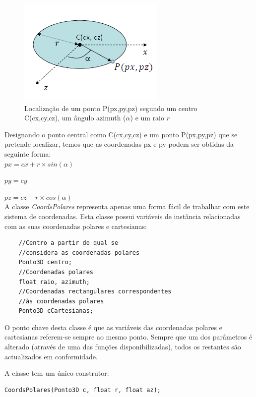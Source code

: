 \begin{figure}[<+htpb+>]
	\centering
	\includegraphics[scale=1.0]{imagens/p1_polarCoords.png}
	\caption{Localização de um ponto P(px,py,pz) segundo um centro C(cx,cy,cz), um ângulo azimuth ($\alpha$) e um raio $r$}
	\label{p1:fig:p1_polarCoords}
\end{figure}

Designando o ponto central como C(cx,cy,cz) e um ponto P(px,py,pz) que se pretende localizar, temos que as coordenadas px e py podem ser obtidas da seguinte forma:\\

	$px = cx + r \times sin(\alpha)$
	
	$py = cy$
	
	$pz = cz + r \times cos(\alpha)$\\

A classe \textit{CoordsPolares} representa apenas uma forma fácil de trabalhar com este sistema de coordenadas. Esta classe possui variáveis de instância relacionadas com as suas coordenadas polares e cartesianas:

\begin{Verbatim}
	//Centro a partir do qual se 
	//considera as coordenadas polares
	Ponto3D centro;
	//Coordenadas polares
	float raio, azimuth;
	//Coordenadas rectangulares correspondentes 
	//às coordenadas polares
	Ponto3D cCartesianas;
\end{Verbatim}

O ponto chave desta classe é que as variáveis das coordenadas polares e cartesianas referem-se sempre ao mesmo ponto. Sempre que um dos parâmetros é alterado (através de uma das funções disponibilizadas), todos os restantes são actualizados em conformidade.

A classe tem um único construtor:

\begin{Verbatim}
CoordsPolares(Ponto3D c, float r, float az);
\end{Verbatim}

